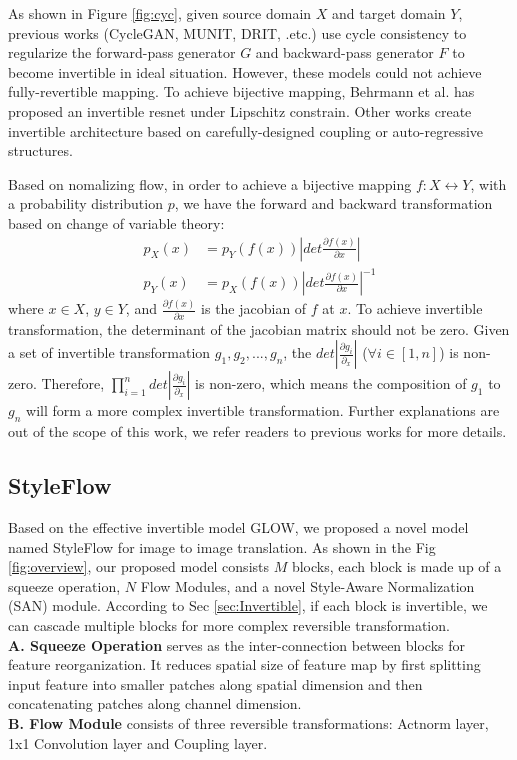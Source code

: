 \documentclass[runningheads]{llncs}
\begin{document}
As shown in Figure \ref{fig:cyc}, given source domain $X$ and target domain $Y$, previous works (CycleGAN\cite{zhu2017unpaired}, MUNIT\cite{huang2018multimodal}, DRIT\cite{lee2018diverse}, .etc.) use cycle consistency to regularize the forward-pass generator $G$ and backward-pass generator $F$ to become invertible in ideal situation. However, these models could not achieve fully-revertible mapping. To achieve bijective mapping, Behrmann\cite{behrmann2019invertible} et al. has proposed an invertible resnet under Lipschitz constrain. Other works\cite{dinh2014nice,dinh2016density,kingma2018glow} create invertible architecture based on carefully-designed coupling or auto-regressive structures. 

Based on nomalizing flow, in order to achieve a bijective mapping $f: X \leftrightarrow Y$, with a probability distribution $p$, we have the forward and backward transformation based on change of variable theory:
\begin{align}
p_X(x) &= p_Y(f(x))|det\frac{\partial f(x)}{\partial x}|\\
  p_Y(x) &= p_X(f(x))|det\frac{\partial f(x)}{\partial x}|^{-1}
\end{align}
where $x\in X$, $y\in Y$, and $\frac{\partial f(x)}{\partial x}$ is the jacobian of $f$ at $x$. To achieve invertible transformation, the determinant of the jacobian matrix should not be zero. Given a set of invertible transformation $g_1,g_2,...,g_n$, the $det|\frac{\partial g_i}{\partial_x}|$ ($\forall i \in [1,n]$) is non-zero. Therefore, $\prod_{i=1}^n det|\frac{\partial g_i}{\partial_x}|$ is non-zero, which means the composition of $g_1$ to $g_n$ will form a more complex invertible transformation. Further explanations are out of the scope of this work, we refer readers to previous works\cite{dinh2014nice,dinh2016density,kingma2018glow,kobyzev2020normalizing} for more details.
\subsection{StyleFlow}
\label{sec:StyleFlow}
Based on the effective invertible model GLOW\cite{kingma2018glow}, we proposed a novel model named StyleFlow for image to image translation. As shown in the Fig \ref{fig:overview}, our proposed model consists $M$ blocks, each block is made up of a squeeze operation, $N$ Flow Modules, and a novel Style-Aware Normalization (SAN) module. According to Sec \ref{sec:Invertible}, if each block is invertible, we can cascade multiple blocks for more complex reversible transformation.\\[1ex]
\noindent\textbf{A. Squeeze Operation} serves as the inter-connection between blocks for feature reorganization. It reduces spatial size of feature map by first splitting input feature into smaller patches along spatial dimension and then concatenating patches along channel dimension.\\[1ex]
\noindent\textbf{B. Flow Module} consists of three reversible transformations: Actnorm layer, 1x1 Convolution layer and Coupling layer. 
\end{document}
